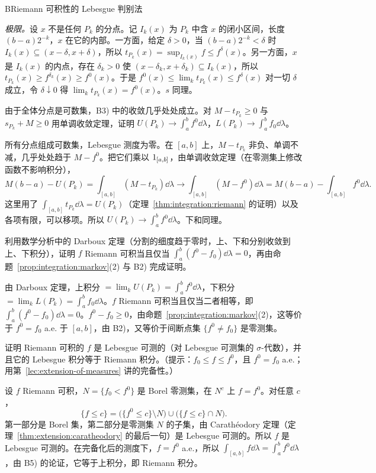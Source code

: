 \begin{probleme}{B}{Riemann 可积性的 Lebesgue 判别法}
\begin{questions}
\begin{solution}
\emph{极限。}设 $x$ 不是任何 $P_k$ 的分点。记 $I_k(x)$ 为 $P_k$ 中含 $x$ 的闭小区间，长度 $(b-a)2^{-k}$，$x$ 在它的内部。一方面，给定 $\delta>0$，当 $(b-a)2^{-k}<\delta$ 时 $I_k(x)\subseteq(x-\delta,x+\delta)$，所以 $t_{P_k}(x)=\sup_{I_k(x)}f\leqslant f^\delta(x)$。另一方面，$x$ 是 $I_k(x)$ 的内点，存在 $\delta_k>0$ 使 $(x-\delta_k,x+\delta_k)\subseteq I_k(x)$，所以 $t_{P_k}(x)\geqslant f^{\delta_k}(x)\geqslant f^0(x)$。于是 $f^0(x)\leqslant\lim_kt_{P_k}(x)\leqslant f^\delta(x)$ 对一切 $\delta$ 成立，令 $\delta\downarrow0$ 得 $\lim_kt_{P_k}(x)=f^0(x)$。$s$ 同理。
\end{solution}
\item 由于全体分点是可数集，B3) 中的收敛几乎处处成立。对 $M-t_{P_k}\geqslant0$ 与 $s_{P_k}+M\geqslant0$ 用单调收敛定理，证明 $U(P_k)\to\int_a^bf^0\dd\lambda$，$L(P_k)\to\int_a^bf_0\dd\lambda$。
\begin{solution}
所有分点组成可数集，Lebesgue 测度为零。在 $[a,b]$ 上，$M-t_{P_k}$ 非负、单调不减，几乎处处趋于 $M-f^0$。把它们乘以 $1_{[a,b]}$，由单调收敛定理（在零测集上修改函数不影响积分），
\[
M(b-a)-U(P_k)=\int_{[a,b]}(M-t_{P_k})\dd\lambda\to\int_{[a,b]}(M-f^0)\dd\lambda=M(b-a)-\int_{[a,b]}f^0\dd\lambda .
\]
这里用了 $\int_{[a,b]}t_{P_k}\dd\lambda=U(P_k)$（定理~\ref{thm:integration:riemann} 的证明）以及各项有限，可以移项。所以 $U(P_k)\to\int_a^bf^0\dd\lambda$。下和同理。
\end{solution}
\item 利用数学分析中的 Darboux 定理（分割的细度趋于零时，上、下和分别收敛到上、下积分），证明 $f$ Riemann 可积当且仅当 $\int_a^b(f^0-f_0)\dd\lambda=0$，再由命题~\ref{prop:integration:markov}(2) 与 B2) 完成证明。
\begin{solution}
由 Darboux 定理，上积分 $=\lim_kU(P_k)=\int_a^bf^0\dd\lambda$，下积分 $=\lim_kL(P_k)=\int_a^bf_0\dd\lambda$。$f$ Riemann 可积当且仅当二者相等，即 $\int_a^b(f^0-f_0)\dd\lambda=0$。$f^0-f_0\geqslant0$，由命题~\ref{prop:integration:markov}(2)，这等价于 $f^0=f_0$ a.e. 于 $[a,b]$，由 B2)，又等价于间断点集 $\{f^0\neq f_0\}$ 是零测集。
\end{solution}
\item 证明 Riemann 可积的 $f$ 是 Lebesgue 可测的（对 Lebesgue 可测集的 $\sigma$-代数），并且它的 Lebesgue 积分等于 Riemann 积分。（提示：$f_0\leqslant f\leqslant f^0$，且 $f^0=f_0$ a.e.；用第~\ref{lec:extension-of-measures} 讲的完备性。）
\begin{solution}
设 $f$ Riemann 可积，$N=\{f_0<f^0\}$ 是 Borel 零测集，在 $N^c$ 上 $f=f^0$。对任意 $c$，
\[
\{f\leqslant c\}=\bigl(\{f^0\leqslant c\}\setminus N\bigr)\cup\bigl(\{f\leqslant c\}\cap N\bigr).
\]
第一部分是 Borel 集，第二部分是零测集 $N$ 的子集，由 Carathéodory 定理（定理~\ref{thm:extension:caratheodory} 的最后一句）是 Lebesgue 可测的。所以 $f$ 是 Lebesgue 可测的。在完备化后的测度下，$f=f^0$ a.e.，所以 $\int_{[a,b]}f\dd\lambda=\int_a^bf^0\dd\lambda$，由 B5) 的论证，它等于上积分，即 Riemann 积分。


\end{solution}
\end{questions}
\end{probleme}

